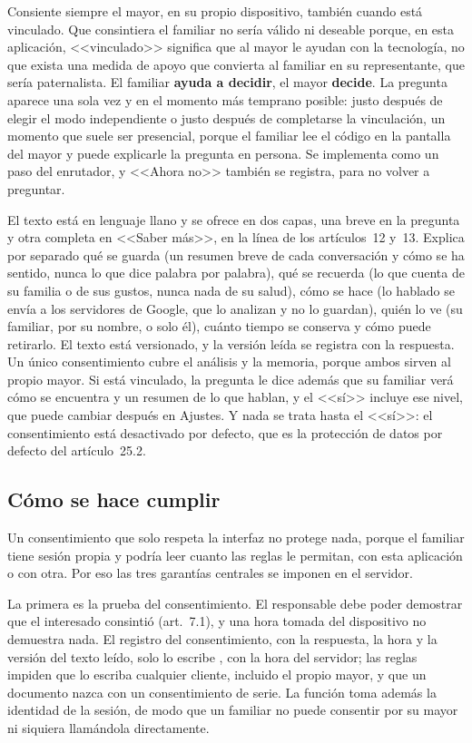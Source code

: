 Consiente siempre el mayor, en su propio dispositivo, también cuando está vinculado. Que consintiera el familiar no sería válido ni deseable porque, en esta aplicación, <<vinculado>> significa que al mayor le ayudan con la tecnología, no que exista una medida de apoyo que convierta al familiar en su representante, que sería paternalista. El familiar \textbf{ayuda a decidir}, el mayor \textbf{decide}. La pregunta aparece una sola vez y en el momento más temprano posible: justo después de elegir el modo independiente o justo después de completarse la vinculación, un momento que suele ser presencial, porque el familiar lee el código en la pantalla del mayor y puede explicarle la pregunta en persona. Se implementa como un paso del enrutador, y <<Ahora no>> también se registra, para no volver a preguntar.

El texto está en lenguaje llano y se ofrece en dos capas, una breve en la pregunta y otra completa en <<Saber más>>, en la línea de los artículos~12 y~13. Explica por separado qué se guarda (un resumen breve de cada conversación y cómo se ha sentido, nunca lo que dice palabra por palabra), qué se recuerda (lo que cuenta de su familia o de sus gustos, nunca nada de su salud), cómo se hace (lo hablado se envía a los servidores de Google, que lo analizan y no lo guardan), quién lo ve (su familiar, por su nombre, o solo él), cuánto tiempo se conserva y cómo puede retirarlo. El texto está versionado, y la versión leída se registra con la respuesta. Un único consentimiento cubre el análisis y la memoria, porque ambos sirven al propio mayor. Si está vinculado, la pregunta le dice además que su familiar verá cómo se encuentra y un resumen de lo que hablan, y el <<sí>> incluye ese nivel, que puede cambiar después en Ajustes. Y nada se trata hasta el <<sí>>: el consentimiento está desactivado por defecto, que es la protección de datos por defecto del artículo~25.2.

\subsection{Cómo se hace cumplir}

Un consentimiento que solo respeta la interfaz no protege nada, porque el familiar tiene sesión propia y podría leer cuanto las reglas le permitan, con esta aplicación o con otra. Por eso las tres garantías centrales se imponen en el servidor.

La primera es la prueba del consentimiento. El responsable debe poder demostrar que el interesado consintió (art.~7.1), y una hora tomada del dispositivo no demuestra nada. El registro del consentimiento, con la respuesta, la hora y la versión del texto leído, solo lo escribe , con la hora del servidor; las reglas impiden que lo escriba cualquier cliente, incluido el propio mayor, y que un documento nazca con un consentimiento de serie. La función toma además la identidad de la sesión, de modo que un familiar no puede consentir por su mayor ni siquiera llamándola directamente.

